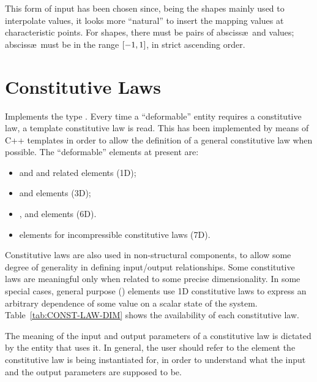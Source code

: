 This form of input has been chosen since, being the shapes mainly used to
interpolate values, it looks more ``natural'' to insert the mapping values
at characteristic points.
For  shapes, there must be 
 pairs of absciss\ae\ and values; absciss\ae\
must be in the range $\left[ -1,1 \right]$, in strict ascending order.


\section{Constitutive Laws}\label{sec:ConstitutiveLaw}
Implements the type \texttt{}.
Every time a ``deformable'' entity requires a constitutive law, a template
constitutive law is read. This has been implemented by means of C++
templates in order to allow the definition of a general constitutive law
when possible.
The ``deformable'' elements at present are:
\begin{itemize}
\item {}
	and
	and related elements (1D);
\item {}
	and 
	elements (3D);
\item {},  and 
        elements (6D).
\item {}
	elements for incompressible constitutive laws (7D).
\end{itemize}

Constitutive laws are also used in non-structural components,
to allow some degree of generality in defining input/output relationships.
Some constitutive laws are meaningful only when related to some precise
dimensionality. 
In some special cases, general purpose ()
elements use 1D constitutive laws to express an arbitrary dependence
of some value on a scalar state of the system.
Table~\ref{tab:CONST-LAW-DIM} shows the availability of each constitutive law.

The meaning of the input and output parameters of a constitutive law
is dictated by the entity that uses it.
In general, the user should refer to the element the constitutive law
is being instantiated for, in order to understand what the input
and the output parameters are supposed to be.

